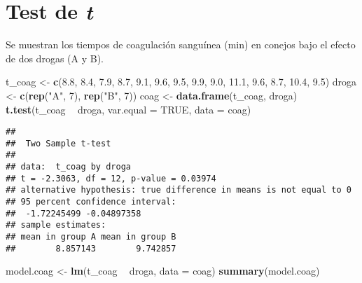 \documentclass[
]{book}
\newenvironment{Shaded}{\begin{snugshade}}{\end{snugshade}}
\newcommand{\DataTypeTok}[1]{\textcolor[rgb]{0.13,0.29,0.53}{#1}}
\newcommand{\DecValTok}[1]{\textcolor[rgb]{0.00,0.00,0.81}{#1}}
\newcommand{\FloatTok}[1]{\textcolor[rgb]{0.00,0.00,0.81}{#1}}
\newcommand{\KeywordTok}[1]{\textcolor[rgb]{0.13,0.29,0.53}{\textbf{#1}}}
\newcommand{\NormalTok}[1]{#1}
\newcommand{\OperatorTok}[1]{\textcolor[rgb]{0.81,0.36,0.00}{\textbf{#1}}}
\newcommand{\OtherTok}[1]{\textcolor[rgb]{0.56,0.35,0.01}{#1}}
\newcommand{\StringTok}[1]{\textcolor[rgb]{0.31,0.60,0.02}{#1}}
\begin{document}
\hypertarget{test-de-t}{%
\section{\texorpdfstring{Test de \emph{t}}{Test de t}}\label{test-de-t}}

Se muestran los tiempos de coagulación sanguínea (min) en conejos bajo el efecto de dos drogas (A y B).

\begin{Shaded}
\begin{Highlighting}[]
\NormalTok{t_coag <-}\StringTok{ }\KeywordTok{c}\NormalTok{(}\FloatTok{8.8}\NormalTok{, }\FloatTok{8.4}\NormalTok{, }\FloatTok{7.9}\NormalTok{, }\FloatTok{8.7}\NormalTok{, }\FloatTok{9.1}\NormalTok{, }\FloatTok{9.6}\NormalTok{, }\FloatTok{9.5}\NormalTok{, }
            \FloatTok{9.9}\NormalTok{, }\FloatTok{9.0}\NormalTok{, }\FloatTok{11.1}\NormalTok{, }\FloatTok{9.6}\NormalTok{, }\FloatTok{8.7}\NormalTok{, }\FloatTok{10.4}\NormalTok{, }\FloatTok{9.5}\NormalTok{) }
\NormalTok{droga <-}\StringTok{ }\KeywordTok{c}\NormalTok{(}\KeywordTok{rep}\NormalTok{(}\StringTok{"A"}\NormalTok{, }\DecValTok{7}\NormalTok{), }\KeywordTok{rep}\NormalTok{(}\StringTok{"B"}\NormalTok{, }\DecValTok{7}\NormalTok{))}
\NormalTok{coag <-}\StringTok{ }\KeywordTok{data.frame}\NormalTok{(t_coag, droga)}
\KeywordTok{t.test}\NormalTok{(t_coag }\OperatorTok{~}\StringTok{ }\NormalTok{droga, }\DataTypeTok{var.equal =} \OtherTok{TRUE}\NormalTok{, }\DataTypeTok{data =}\NormalTok{ coag)}
\end{Highlighting}
\end{Shaded}

\begin{verbatim}
## 
##  Two Sample t-test
## 
## data:  t_coag by droga
## t = -2.3063, df = 12, p-value = 0.03974
## alternative hypothesis: true difference in means is not equal to 0
## 95 percent confidence interval:
##  -1.72245499 -0.04897358
## sample estimates:
## mean in group A mean in group B 
##        8.857143        9.742857
\end{verbatim}

\begin{Shaded}
\begin{Highlighting}[]
\NormalTok{model.coag <-}\StringTok{ }\KeywordTok{lm}\NormalTok{(t_coag }\OperatorTok{~}\StringTok{ }\NormalTok{droga, }\DataTypeTok{data =}\NormalTok{ coag)}
\KeywordTok{summary}\NormalTok{(model.coag)}
\end{Highlighting}
\end{Shaded}
\end{document}
